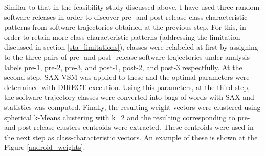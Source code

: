Similar to that in the feasibility study discussed above, I have used three random software releases in order to discover pre- and post-release class-characteristic patterns from software trajectories obtained at the previous step. For this, in order to retain more class-characteristic patterns (addressing the limitation discussed in section \ref{sta_limitations}), classes were relabeled at first by assigning to the three pairs of  pre- and post- release software trajectories under analysis labels pre-1, pre-2, pre-3, and post-1, post-2, and post-3 respectfully. At the second step, SAX-VSM was applied to these and the optimal parameters were determined with DIRECT execution. Using this parameters, at the third step, the software trajectory classes were converted into bags of words with SAX and \tfidf statistics was computed. Finally, the resulting weight vectors were clustered using spherical k-Means clustering with k=2 and the resulting corresponding to pre- and post-release clusters centroids were extracted. These centroids were used in the next step as class-characteristic vectors. An example of these is shown at the Figure \ref{android_weights}.

\begin{table}[t]
\centering
{}
\end{table}

